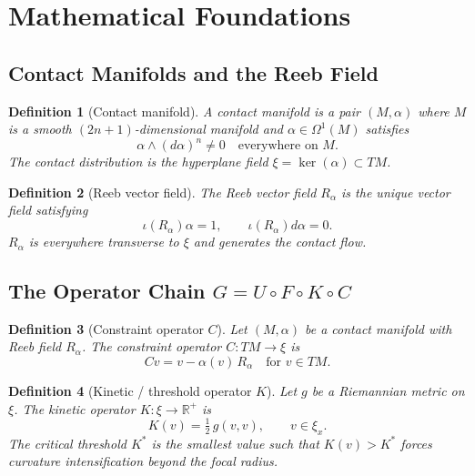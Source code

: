 \documentclass[12pt]{article}
\numberwithin{equation}{section}
\newtheorem{definition}{Definition}[section]
\theoremstyle{remark}
\begin{document}
\section{Mathematical Foundations}

\subsection{Contact Manifolds and the Reeb Field}

\begin{definition}[Contact manifold]
A \emph{contact manifold} is a pair $(M,\alpha)$ where $M$ is a smooth
$(2n+1)$-dimensional manifold and $\alpha\in\Omega^1(M)$ satisfies
\[
  \alpha\wedge(d\alpha)^n \neq 0 \quad\text{everywhere on }M.
\]
The \emph{contact distribution} is the hyperplane field $\xi=\ker(\alpha)\subset TM$.
\end{definition}

\begin{definition}[Reeb vector field]
The \emph{Reeb vector field} $R_\alpha$ is the unique vector field satisfying
\[
  \iota(R_\alpha)\alpha = 1,\qquad \iota(R_\alpha)d\alpha = 0.
\]
$R_\alpha$ is everywhere transverse to $\xi$ and generates the contact flow.
\end{definition}

\subsection{The Operator Chain \texorpdfstring{$G = U\circ F\circ K\circ C$}{G}}

\begin{definition}[Constraint operator $C$]
Let $(M,\alpha)$ be a contact manifold with Reeb field $R_\alpha$. The
\emph{constraint operator} $C: TM\to\xi$ is
\[
  Cv = v - \alpha(v)\,R_\alpha \quad\text{for }v\in TM.
\]
\end{definition}

\begin{definition}[Kinetic / threshold operator $K$]
Let $g$ be a Riemannian metric on $\xi$. The \emph{kinetic operator}
$K:\xi\to\mathbb{R}^+$ is
\[
  K(v) = \tfrac{1}{2}\,g(v,v),\qquad v\in\xi_x.
\]
The \emph{critical threshold} $K^*$ is the smallest value such that
$K(v)>K^*$ forces curvature intensification beyond the focal radius.
\end{definition}
\end{document}

